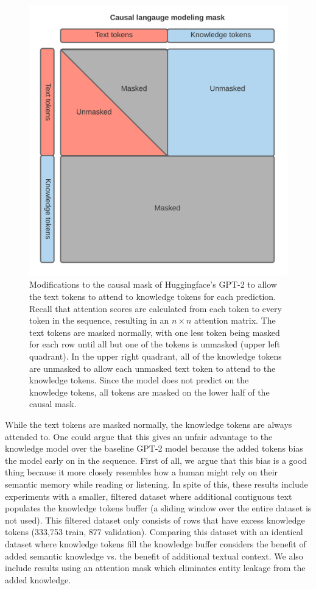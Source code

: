 \documentclass[phd,electronic,oneside,twosidetoc,letterpaper,chaptercenter,parttop,lof]{byumsphd}
\begin{document}
\begin{figure}
    \centering
    \includegraphics[width=0.5\linewidth]{images/ssm/knowledge_model_causal_mask.png}
    \caption[Knowledge model causal mask]{
        Modifications to the causal mask of Huggingface's GPT-2 to allow the text tokens to attend to knowledge tokens for each prediction.
        Recall that attention scores are calculated from each token to every token in the sequence, resulting in an $n \times n$ attention matrix.
        The text tokens are masked normally, with one less token being masked for each row until all but one of the tokens is unmasked (upper left quadrant).
        In the upper right quadrant, all of the knowledge tokens are unmasked to allow each unmasked text token to attend to the knowledge tokens.
        Since the model does not predict on the knowledge tokens, all tokens are masked on the lower half of the causal mask.
    }
    \label{fig:knowledge_model}
\end{figure}
        
While the text tokens are masked normally, the knowledge tokens are always attended to.
One could argue that this gives an unfair advantage to the knowledge model over the baseline GPT-2 model because the added tokens bias the model early on in the sequence.
First of all, we argue that this bias is a good thing because it more closely resembles how a human might rely on their semantic memory while reading or listening.
In spite of this, these results include experiments with a smaller, filtered dataset where additional contiguous text populates the knowledge tokens buffer (a sliding window over the entire dataset is not used).
This filtered dataset only consists of rows that have excess knowledge tokens (333,753 train, 877 validation). 
Comparing this dataset with an identical dataset where knowledge tokens fill the knowledge buffer considers the benefit of added semantic knowledge vs. the benefit of additional textual context.
We also include results using an attention mask which eliminates entity leakage from the added knowledge.
\end{document}
